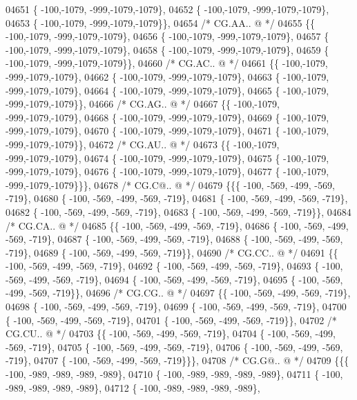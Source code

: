 \begin{DoxyCode}
04651 \{ -100,-1079, -999,-1079,-1079\},
04652 \{ -100,-1079, -999,-1079,-1079\},
04653 \{ -100,-1079, -999,-1079,-1079\}\},
04654 \textcolor{comment}{/* CG.AA.. @ */}
04655 \{\{ -100,-1079, -999,-1079,-1079\},
04656 \{ -100,-1079, -999,-1079,-1079\},
04657 \{ -100,-1079, -999,-1079,-1079\},
04658 \{ -100,-1079, -999,-1079,-1079\},
04659 \{ -100,-1079, -999,-1079,-1079\}\},
04660 \textcolor{comment}{/* CG.AC.. @ */}
04661 \{\{ -100,-1079, -999,-1079,-1079\},
04662 \{ -100,-1079, -999,-1079,-1079\},
04663 \{ -100,-1079, -999,-1079,-1079\},
04664 \{ -100,-1079, -999,-1079,-1079\},
04665 \{ -100,-1079, -999,-1079,-1079\}\},
04666 \textcolor{comment}{/* CG.AG.. @ */}
04667 \{\{ -100,-1079, -999,-1079,-1079\},
04668 \{ -100,-1079, -999,-1079,-1079\},
04669 \{ -100,-1079, -999,-1079,-1079\},
04670 \{ -100,-1079, -999,-1079,-1079\},
04671 \{ -100,-1079, -999,-1079,-1079\}\},
04672 \textcolor{comment}{/* CG.AU.. @ */}
04673 \{\{ -100,-1079, -999,-1079,-1079\},
04674 \{ -100,-1079, -999,-1079,-1079\},
04675 \{ -100,-1079, -999,-1079,-1079\},
04676 \{ -100,-1079, -999,-1079,-1079\},
04677 \{ -100,-1079, -999,-1079,-1079\}\}\},
04678 \textcolor{comment}{/* CG.C@.. @ */}
04679 \{\{\{ -100, -569, -499, -569, -719\},
04680 \{ -100, -569, -499, -569, -719\},
04681 \{ -100, -569, -499, -569, -719\},
04682 \{ -100, -569, -499, -569, -719\},
04683 \{ -100, -569, -499, -569, -719\}\},
04684 \textcolor{comment}{/* CG.CA.. @ */}
04685 \{\{ -100, -569, -499, -569, -719\},
04686 \{ -100, -569, -499, -569, -719\},
04687 \{ -100, -569, -499, -569, -719\},
04688 \{ -100, -569, -499, -569, -719\},
04689 \{ -100, -569, -499, -569, -719\}\},
04690 \textcolor{comment}{/* CG.CC.. @ */}
04691 \{\{ -100, -569, -499, -569, -719\},
04692 \{ -100, -569, -499, -569, -719\},
04693 \{ -100, -569, -499, -569, -719\},
04694 \{ -100, -569, -499, -569, -719\},
04695 \{ -100, -569, -499, -569, -719\}\},
04696 \textcolor{comment}{/* CG.CG.. @ */}
04697 \{\{ -100, -569, -499, -569, -719\},
04698 \{ -100, -569, -499, -569, -719\},
04699 \{ -100, -569, -499, -569, -719\},
04700 \{ -100, -569, -499, -569, -719\},
04701 \{ -100, -569, -499, -569, -719\}\},
04702 \textcolor{comment}{/* CG.CU.. @ */}
04703 \{\{ -100, -569, -499, -569, -719\},
04704 \{ -100, -569, -499, -569, -719\},
04705 \{ -100, -569, -499, -569, -719\},
04706 \{ -100, -569, -499, -569, -719\},
04707 \{ -100, -569, -499, -569, -719\}\}\},
04708 \textcolor{comment}{/* CG.G@.. @ */}
04709 \{\{\{ -100, -989, -989, -989, -989\},
04710 \{ -100, -989, -989, -989, -989\},
04711 \{ -100, -989, -989, -989, -989\},
04712 \{ -100, -989, -989, -989, -989\},

\end{DoxyCode}
